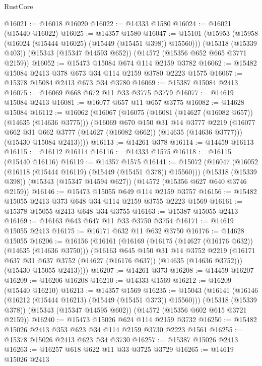 \begin{lexlean}{RustCore}
\begin{coremodule}
@16021 := @16018 @16020
@16022 := @14333 @1580
@16024 := @16021 (@15440 @16022)
@16025 := @14357 @1580
@16047 := @15101
    (@15953 (@15958 (@16024 (@15444 @16025) (@15449 (@15451 @398)) @15560)))
    (@15318 (@15339 @403))
    (@15343 (@15347 @14593 @652))
    (@14572 (@15356 @652 @665 @3771 @2159))
@16052 := @15473 @15084 @674 @114 @2159 @3782
@16062 := @15482 @15084 @2413 @378 @673 @34 @114 @2159 @3780 @2223 @1575
@16067 := @15378 @15084 @2413 @673 @34 @3780
@16069 := @15387 @15084 @2413
@16075 := @16069 @668 @672 @11 @33 @3775 @3779
@16077 := @14619 @15084 @2413
@16081 := @16077 @657 @11 @657 @3775
@16082 := @14628 @15084
@16112 := @16062
    (@16067
      (@16075
        (@16081 (@14627 (@16082 @657)) (@14635 (@14636 @3775)))
        (@16069
          @670
          @150
          @31
          @14
          @3777
          @2219
          (@16077 @662 @31 @662 @3777 (@14627 (@16082 @662)) (@14635 (@14636 @3777)))
          (@15430 @15084 @2413))))
@16113 := @14261 @378
@16114 := @14459 @16113
@16115 := @16112 @16114
@16116 := @14333 @1575
@16118 := @16115 (@15440 @16116)
@16119 := @14357 @1575
@16141 := @15072
    (@16047 (@16052 (@16118 (@15444 @16119) (@15449 (@15451 @378)) @15560)))
    (@15318 (@15339 @398))
    (@15343 (@15347 @14594 @627))
    (@14572 (@15356 @627 @640 @3746 @2159))
@16146 := @15473 @15055 @649 @114 @2159 @3757
@16156 := @15482 @15055 @2413 @373 @648 @34 @114 @2159 @3755 @2223 @1569
@16161 := @15378 @15055 @2413 @648 @34 @3755
@16163 := @15387 @15055 @2413
@16169 := @16163 @643 @647 @11 @33 @3750 @3754
@16171 := @14619 @15055 @2413
@16175 := @16171 @632 @11 @632 @3750
@16176 := @14628 @15055
@16206 := @16156
    (@16161
      (@16169
        (@16175 (@14627 (@16176 @632)) (@14635 (@14636 @3750)))
        (@16163
          @645
          @150
          @31
          @14
          @3752
          @2219
          (@16171 @637 @31 @637 @3752 (@14627 (@16176 @637)) (@14635 (@14636 @3752)))
          (@15430 @15055 @2413))))
@16207 := @14261 @373
@16208 := @14459 @16207
@16209 := @16206 @16208
@16210 := @14333 @1569
@16212 := @16209 (@15440 @16210)
@16213 := @14357 @1569
@16235 := @15043
    (@16141 (@16146 (@16212 (@15444 @16213) (@15449 (@15451 @373)) @15560)))
    (@15318 (@15339 @378))
    (@15343 (@15347 @14595 @602))
    (@14572 (@15356 @602 @615 @3721 @2159))
@16240 := @15473 @15026 @624 @114 @2159 @3732
@16250 := @15482 @15026 @2413 @353 @623 @34 @114 @2159 @3730 @2223 @1561
@16255 := @15378 @15026 @2413 @623 @34 @3730
@16257 := @15387 @15026 @2413
@16263 := @16257 @618 @622 @11 @33 @3725 @3729
@16265 := @14619 @15026 @2413

\end{coremodule}
\end{lexlean}
